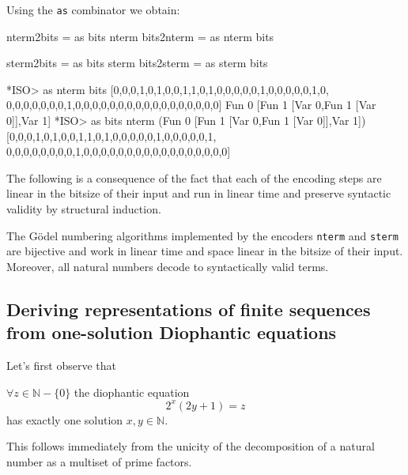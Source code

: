 \documentclass[]{INCLUDES/llncs}
\begin{document}
Using the {\tt as} combinator we obtain:

\begin{code}
nterm2bits = as bits nterm
bits2nterm = as nterm bits

sterm2bits = as bits sterm
bits2sterm = as sterm bits
\end{code}

\begin{codex}
*ISO> as nterm bits 
  [0,0,0,1,0,1,0,0,1,1,0,1,0,0,0,0,0,1,0,0,0,0,0,1,0,
   0,0,0,0,0,0,0,1,0,0,0,0,0,0,0,0,0,0,0,0,0,0,0,0,0]
Fun 0 [Fun 1 [Var 0,Fun 1 [Var 0]],Var 1]
*ISO> as bits nterm 
    (Fun 0 [Fun 1 [Var 0,Fun 1 [Var 0]],Var 1])
[0,0,0,1,0,1,0,0,1,1,0,1,0,0,0,0,0,1,0,0,0,0,0,1,
 0,0,0,0,0,0,0,0,1,0,0,0,0,0,0,0,0,0,0,0,0,0,0,0,0,0]
\end{codex}

The following is a consequence of the fact that each of the encoding steps are
linear in the bitsize of their input and run in linear time and preserve
syntactic validity by structural induction.
\begin{prop}
The G\"odel numbering algorithms implemented by the encoders {\tt nterm} and
{\tt sterm} are bijective
and work in linear time and space linear in the bitsize of their input.
Moreover, all natural numbers decode to syntactically valid terms.
\end{prop}

\subsection{Deriving representations of finite sequences from one-solution
Diophantic equations} \label{dio}
Let's first observe that
\begin{prop}
$\forall z \in \mathbb{N}-\{0\}$ the diophantic equation
\begin{equation}
2^x(2y+1)=z
\end{equation}
has exactly one solution $x,y \in \mathbb{N}$.
\end{prop}
This follows immediately from the unicity of the decomposition of a natural
number as a multiset of prime factors. 
\end{document}
